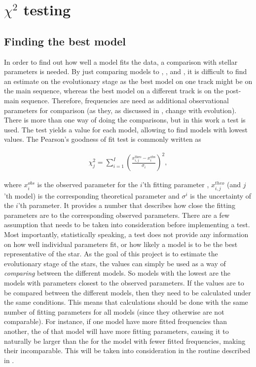 \section{$\chi^2$ testing}
\label{sec:chis}

\subsection{Finding the best model}
\label{bestmodel}


In order to find out how well a model fits the data, a comparison with stellar parameters is needed. By just comparing models to \lum,  \teff, and \logg, it is difficult to find an estimate on the evolutionary stage as the best model on one track might be on the main sequence, whereas the best model on a different track is on the post-main sequence. Therefore, frequencies are need as additional observational parameters for comparison (as they, as discussed in , change with evolution). There is more than one way of doing the comparisons, but in this work a \chis test is used. The \chis test yields a value for each model, allowing to find models with lowest \chis values. The Pearson's goodness of fit test is commonly written as 

\begin{align}
\label{standard_chi}
\chi^2_j = \sum^I_{i=1}\left(\frac{x^{\text{theo}}_{i,j}-x^{\text{obs}}_i}{\sigma_i}\right)^2,
\end{align}

\noindent where $x_i^{obs}$ is the observed parameter for the $i$'th fitting parameter , $x^{theo}_{i,j}$ (and $j$'th model) is the corresponding theoretical parameter and $\sigma^i$ is the uncertainty of the $i$'th parameter. It provides a number that describes how close the fitting parameters are to the corresponding observed parameters. There are a few assumption that needs to be taken into consideration before implementing a \chis test. Most importantly, statistically speaking, a \chis test does not provide any information on how well individual parameters fit, or how likely a model is to be the best representative of the star. As the goal of this project is to estimate the evolutionary stage of the stars, the \chis values can simply be used as a way of \textit{comparing} between the different models. So models with the lowest \chis are the models with parameters closest to the observed parameters. 
If the \chis values are to be compared between the different models, then they need to be calculated under the same conditions. This means that calculations should be done with the same number of fitting parameters for all models (since they otherwise are not comparable). For instance, if one model have more fitted frequencies than another, the \chis of that model will have more fitting parameters, causing it to naturally be larger than the \chis for the model with fewer fitted frequencies, making their \chis incomparable. This will be taken into consideration in the routine described in .

